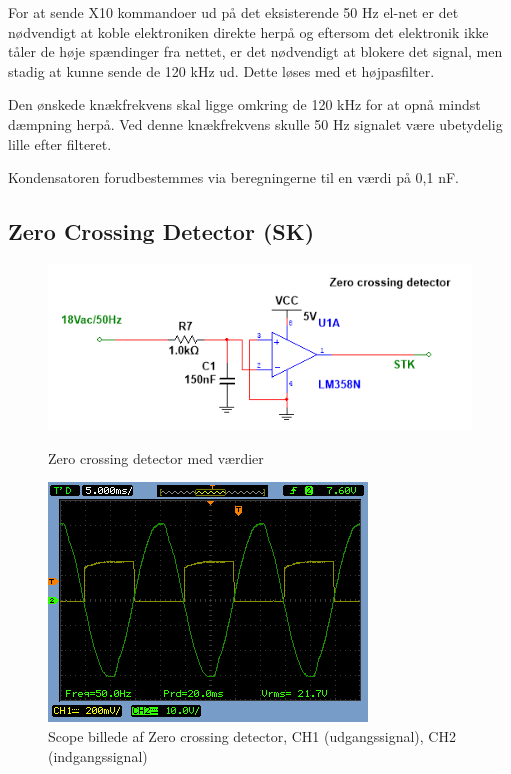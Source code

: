 For at sende X10 kommandoer ud på det eksisterende 50 Hz el-net er det nødvendigt at koble elektroniken direkte herpå og eftersom det elektronik ikke tåler de høje spændinger fra nettet, er det nødvendigt at blokere det signal, men stadig at kunne sende de 120 kHz ud. Dette løses med et højpasfilter.

Den ønskede knækfrekvens skal ligge omkring de 120 kHz for at opnå mindst dæmpning herpå. Ved denne knækfrekvens skulle 50 Hz signalet være ubetydelig lille efter filteret. 

Kondensatoren forudbestemmes via beregningerne til en værdi på 0,1 nF.


\newpage
  
\subsection{Zero Crossing Detector (SK)}
\begin{figure}[htb]
  \begin{minipage}{0.45\textwidth}
    \centering
      \includegraphics[width=\textwidth]{billeder/HWdesign/ZC_MV}
      \caption{Zero crossing detector med værdier}
    \label{fig:ZC_MV}
  \end{minipage}
  \hspace{0.1\textwidth}
  \begin{minipage}{0.45\textwidth}
    \centering
      \includegraphics[width=\textwidth]{billeder/HWTest/Encoder/Encoder_zerocross}
      \caption{Scope billede af Zero crossing detector, CH1 (udgangssignal), CH2 (indgangssignal)}
    \label{fig:Encoder_Zerocross}
  \end{minipage}
\end{figure}

